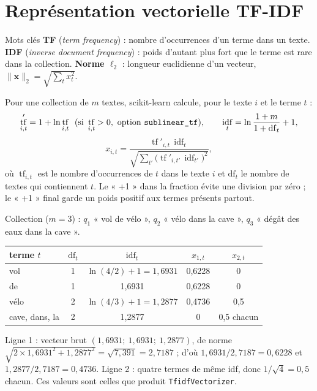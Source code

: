 \documentclass[11pt,a4paper]{article}
\newcommand{\vect}[1]{\bm{#1}}
\DeclareMathOperator{\idf}{idf}
\DeclareMathOperator{\tf}{tf}
\begin{document}
\section{Représentation vectorielle TF-IDF}

\begin{defbox}{Mots clés}
\textbf{TF} (\emph{term frequency}) : nombre d'occurrences d'un terme dans un texte.
\textbf{IDF} (\emph{inverse document frequency}) : poids d'autant plus fort que le terme est rare
dans la collection. \textbf{Norme $\ell_2$} : longueur euclidienne d'un vecteur,
$\|\vect{x}\|_2=\sqrt{\sum_t x_t^2}$.
\end{defbox}

Pour une collection de $m$ textes, scikit-learn calcule, pour le texte $i$ et le terme $t$ :
\[
\tf'_{i,t} = 1 + \ln \tf_{i,t}\ \ (\text{si } \tf_{i,t}>0,\ \text{option \texttt{sublinear\_tf}}),\qquad
\idf_t = \ln\frac{1+m}{1+\mathrm{df}_t} + 1,
\]
\[
x_{i,t} = \frac{\tf'_{i,t}\,\idf_t}{\sqrt{\sum_{t'} \big(\tf'_{i,t'}\,\idf_{t'}\big)^2}},
\]
où $\tf_{i,t}$ est le nombre d'occurrences de $t$ dans le texte $i$ et $\mathrm{df}_t$ le nombre de
textes qui contiennent $t$. Le « +1 » dans la fraction évite une division par zéro ; le « +1 » final
garde un poids positif aux termes présents partout.

\begin{exemple}
Collection ($m=3$) : $q_1$ « vol de vélo », $q_2$ « vélo dans la cave », $q_3$ « dégât des eaux dans la cave ».

\smallskip
\begin{tabular}{lcccc}
\toprule
terme $t$ & $\mathrm{df}_t$ & $\idf_t$ & $x_{1,t}$ & $x_{2,t}$ \\
\midrule
vol & 1 & $\ln(4/2)+1 = 1{,}6931$ & 0,6228 & 0 \\
de  & 1 & 1,6931 & 0,6228 & 0 \\
vélo & 2 & $\ln(4/3)+1 = 1{,}2877$ & 0,4736 & 0,5 \\
cave, dans, la & 2 & 1,2877 & 0 & 0,5 chacun \\
\bottomrule
\end{tabular}

\smallskip
Ligne 1 : vecteur brut $(1{,}6931;\ 1{,}6931;\ 1{,}2877)$, de norme
$\sqrt{2\times1{,}6931^2+1{,}2877^2}=\sqrt{7{,}391}=2{,}7187$ ; d'où
$1{,}6931/2{,}7187=0{,}6228$ et $1{,}2877/2{,}7187=0{,}4736$. Ligne 2 : quatre termes de même idf,
donc $1/\sqrt4=0{,}5$ chacun. Ces valeurs sont celles que produit \texttt{TfidfVectorizer}.
\end{exemple}
\end{document}
